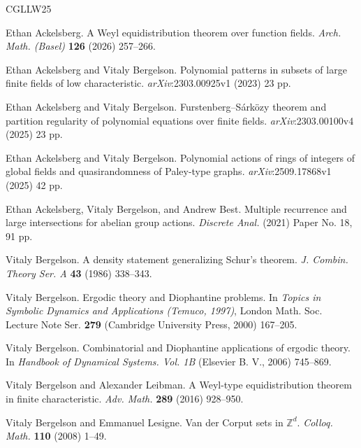 \documentclass[11pt]{amsart}
\theoremstyle{theorem}
\theoremstyle{definition}
\begin{document}

\begin{thebibliography}{CGLLW25}

Ethan Ackelsberg.
\newblock	A Weyl equidistribution theorem over function fields.
\newblock	\emph{Arch. Math. (Basel)} \textbf{126} (2026) 257--266.

Ethan Ackelsberg and Vitaly Bergelson.
\newblock	Polynomial patterns in subsets of large finite fields of low characteristic.
\newblock	\emph{arXiv}:2303.00925v1 (2023) 23 pp.

Ethan Ackelsberg and Vitaly Bergelson.
\newblock	Furstenberg--S\'{a}rk\"{o}zy theorem and partition regularity of polynomial equations over finite fields.
\newblock	\emph{arXiv}:2303.00100v4 (2025) 23 pp.

Ethan Ackelsberg and Vitaly Bergelson.
\newblock	Polynomial actions of rings of integers of global fields and quasirandomness of Paley-type graphs.
\newblock	\emph{arXiv}:2509.17868v1 (2025) 42 pp.

Ethan Ackelsberg, Vitaly Bergelson, and Andrew Best.
\newblock   Multiple recurrence and large intersections for abelian group actions.
\newblock   \emph{Discrete Anal.} (2021) Paper No. 18, 91 pp.

Vitaly Bergelson.
\newblock   A density statement generalizing Schur’s theorem.
\newblock   \emph{J. Combin. Theory Ser. A} \textbf{43} (1986) 338--343.

Vitaly Bergelson.
\newblock Ergodic theory and Diophantine problems.
\newblock   In \emph{Topics in Symbolic Dynamics and Applications (Temuco, 1997)}, London Math. Soc. Lecture Note Ser. \textbf{279} (Cambridge University Press, 2000) 167--205.

Vitaly Bergelson.
\newblock Combinatorial and Diophantine applications of ergodic theory.
\newblock   In \emph{Handbook of Dynamical Systems. Vol. 1B} (Elsevier B. V., 2006) 745--869.

Vitaly Bergelson and Alexander Leibman.
\newblock	A Weyl-type equidistribution theorem in finite characteristic.
\newblock	\emph{Adv. Math.} \textbf{289} (2016) 928--950.

Vitaly Bergelson and Emmanuel Lesigne.
\newblock   Van der Corput sets in $\mathbb{Z}^d$.
\newblock   \emph{Colloq. Math.} \textbf{110} (2008) 1--49.


\end{thebibliography}
\end{document}
